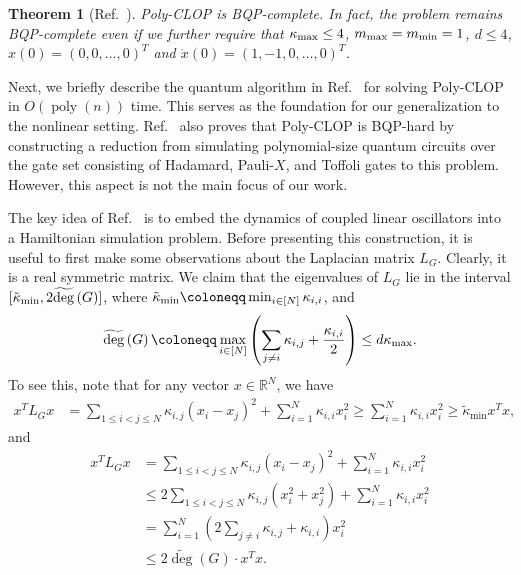 \documentclass[superscriptaddress,onecolumn,nofootinbib,longbibliography,a4paper,accepted=2026-09-29]{quantumarticle}
\theoremstyle{plain}
\newtheorem{thm}{Theorem}
\theoremstyle{definition}
\numberwithin{thm}{section}
\numberwithin{assumption}{section}
\numberwithin{lemma}{section}
\numberwithin{prop}{section}
\numberwithin{cor}{section}
\numberwithin{definition}{section}
\numberwithin{rmk}{section}
\numberwithin{equation}{section}
\newcommand{\R}{\mathbb{R}}
\newcommand{\lrb}[1]{\left ( #1 \right )}
\newcommand{\defeq}{\coloneqq}
\newcommand{\mypoly}[1]{\operatorname{poly} \lrb{#1}}
\newcommand{\myO}[1]{O\lrb{#1}}
\newcommand{\tdeg}[1]{\widetilde{\operatorname{deg}}\lrb{#1}}
\begin{document}
\begin{thm}[Ref.~\cite{babbush2023exponential}]
Poly-CLOP is BQP-complete. In fact, the problem remains BQP-complete even if we further require that $\kappa_{\rm max}\le 4$,
$m_{\rm max}=m_{\rm min}=1$, $d \le 4$, $x(0)=(0,0,\dots,0)^T$ and $\dot{x}(0)=(1, -1, 0, \dots, 0)^T$.
\end{thm}

Next, we briefly describe the quantum algorithm in Ref.~\cite{babbush2023exponential} for solving Poly-CLOP in $\myO{\mypoly{n}}$ time. This serves as the foundation for our generalization to the nonlinear setting. Ref.~\cite{babbush2023exponential} also proves that Poly-CLOP is BQP-hard by constructing a reduction from simulating polynomial-size quantum circuits over the gate set consisting of Hadamard, Pauli-$X$, and Toffoli gates to this problem. However, this aspect is not the main focus of our work.

The key idea of Ref.~\cite{babbush2023exponential} is to embed the dynamics of coupled linear oscillators into a Hamiltonian simulation problem. Before presenting this construction, it is useful to first make some observations about the Laplacian matrix
$L_G$. Clearly, it is a real symmetric matrix. We claim that the eigenvalues of $L_G$ lie in the interval  $[\tilde{\kappa}_{\rm min}, 2\tdeg{G}]$,
where $\tilde{\kappa}_{\rm min} \defeq \min_{i \in [N]} \kappa_{i,i}$, and
\begin{align}
\tdeg{G} \defeq \max_{i \in [N]} \lrb{\sum_{j\neq i} \kappa_{i,j}+\frac{\kappa_{i,i}}{2}}  \le d\kappa_{\rm max}.  
\end{align}
To see this, note that for any vector $x \in \R^N$, we have
\begin{align}
x^T L_G x &= \sum_{1\le i<j \le N} \kappa_{i,j}(x_i-x_j)^2 + \sum_{i=1}^N \kappa_{i,i}x_i^2 
\ge \sum_{i=1}^N \kappa_{i,i}x_i^2 
\ge \tilde{\kappa}_{\mathrm{min}} x^Tx,
\end{align}
and
\begin{align}
x^T L_G x &= \sum_{1\le i<j \le N} \kappa_{i,j}(x_i-x_j)^2 + \sum_{i=1}^N \kappa_{i,i}x_i^2 \\
& \le 
2\sum_{1\le i<j \le N} \kappa_{i,j}(x_i^2+x_j^2)
+\sum_{i=1}^N \kappa_{i,i}x_i^2 \\
&=\sum_{i=1}^N \lrb{2\sum_{j\neq i}\kappa_{i,j}+\kappa_{i,i}} x_i^2 \\
&\le 2 \tdeg{G} \cdot x^Tx.
\end{align}
\end{document}
